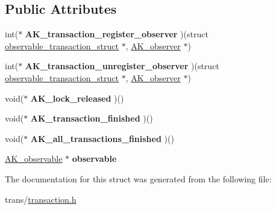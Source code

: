 \subsection*{Public Attributes}
\begin{DoxyCompactItemize}
\item 
\mbox{\label{structobservable__transaction__struct_a55a99c7c17b86bed699c92ccd376e74c}} 
int($\ast$ {\bfseries A\+K\+\_\+transaction\+\_\+register\+\_\+observer} )(struct \hyperlink{structobservable__transaction__struct}{observable\+\_\+transaction\+\_\+struct} $\ast$, \hyperlink{structObserver}{A\+K\+\_\+observer} $\ast$)
\item 
\mbox{\label{structobservable__transaction__struct_a75e49bf7dd46c0c18b7e157fd277eab3}} 
int($\ast$ {\bfseries A\+K\+\_\+transaction\+\_\+unregister\+\_\+observer} )(struct \hyperlink{structobservable__transaction__struct}{observable\+\_\+transaction\+\_\+struct} $\ast$, \hyperlink{structObserver}{A\+K\+\_\+observer} $\ast$)
\item 
\mbox{\label{structobservable__transaction__struct_a3674428ce2071802257887f7a479c610}} 
void($\ast$ {\bfseries A\+K\+\_\+lock\+\_\+released} )()
\item 
\mbox{\label{structobservable__transaction__struct_a63d5a61f54891e6f0cfe79124fd84dd4}} 
void($\ast$ {\bfseries A\+K\+\_\+transaction\+\_\+finished} )()
\item 
\mbox{\label{structobservable__transaction__struct_af16a498f9091c7b08173c8dceaf30b3c}} 
void($\ast$ {\bfseries A\+K\+\_\+all\+\_\+transactions\+\_\+finished} )()
\item 
\mbox{\label{structobservable__transaction__struct_ac03a8590cbe1010bef9153196eaaba82}} 
\hyperlink{structObservable}{A\+K\+\_\+observable} $\ast$ {\bfseries observable}
\end{DoxyCompactItemize}


The documentation for this struct was generated from the following file\+:\begin{DoxyCompactItemize}
\item 
trans/\hyperlink{transaction_8h}{transaction.\+h}\end{DoxyCompactItemize}
